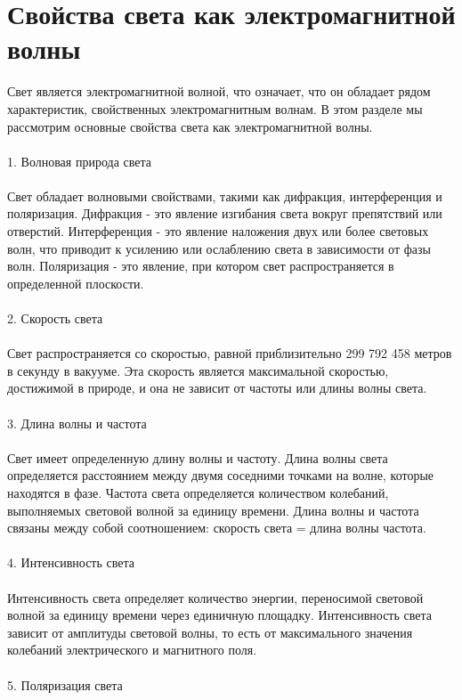 \documentclass{article}
\begin{document}
\newpage
\section{Свойства света как электромагнитной волны}
Свет является электромагнитной волной, что означает, что он обладает рядом характеристик, свойственных электромагнитным волнам. В этом разделе мы рассмотрим основные свойства света как электромагнитной волны.\\
~\\
1. Волновая природа света\\
~\\
Свет обладает волновыми свойствами, такими как дифракция, интерференция и поляризация. Дифракция - это явление изгибания света вокруг препятствий или отверстий. Интерференция - это явление наложения двух или более световых волн, что приводит к усилению или ослаблению света в зависимости от фазы волн. Поляризация - это явление, при котором свет распространяется в определенной плоскости.\\
~\\
2. Скорость света\\
~\\
Свет распространяется со скоростью, равной приблизительно 299 792 458 метров в секунду в вакууме. Эта скорость является максимальной скоростью, достижимой в природе, и она не зависит от частоты или длины волны света.\\
~\\
3. Длина волны и частота\\
~\\
Свет имеет определенную длину волны и частоту. Длина волны света определяется расстоянием между двумя соседними точками на волне, которые находятся в фазе. Частота света определяется количеством колебаний, выполняемых световой волной за единицу времени. Длина волны и частота связаны между собой соотношением: скорость света = длина волны  частота.\\
~\\
4. Интенсивность света\\
~\\
Интенсивность света определяет количество энергии, переносимой световой волной за единицу времени через единичную площадку. Интенсивность света зависит от амплитуды световой волны, то есть от максимального значения колебаний электрического и магнитного поля.\\
~\\
5. Поляризация света\\
~\\
\end{document}
